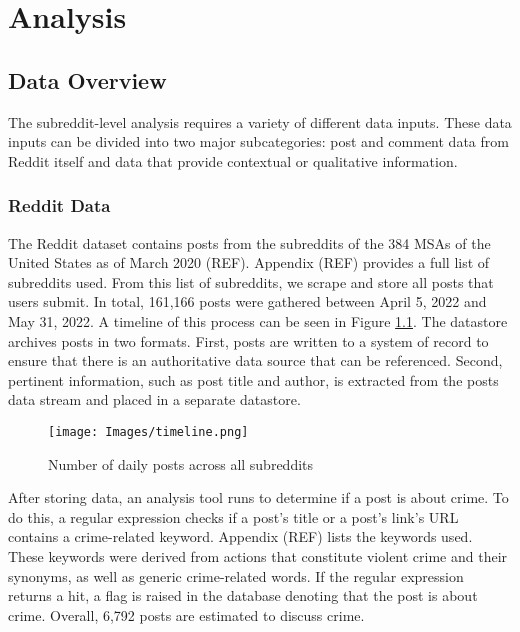 \documentclass[12pt,oneside, letterpaper]{book}
\begin{document}
\chapter{Analysis}

\section{Data Overview}
\par The subreddit-level analysis requires a variety of different data inputs. These data inputs can be divided into two major subcategories: post and comment data from Reddit itself and data that provide contextual or qualitative information.

\subsection{Reddit Data}
\par The Reddit dataset contains posts from the subreddits of the 384 MSAs of the United States as of March 2020 (REF). Appendix (REF) provides a full list of subreddits used. From this list of subreddits, we scrape and store all posts that users submit. In total, 161,166 posts were gathered between April 5, 2022 and May 31, 2022. A timeline of this process can be seen in Figure \ref{fig:line-1}. The datastore archives posts in two formats. First, posts are written to a system of record to ensure that there is an authoritative data source that can be referenced. Second, pertinent information, such as post title and author, is extracted from the posts data stream and placed in a separate datastore.

\begin{figure}[ht]
    \texttt{[image: Images/timeline.png]}
    \caption{Number of daily posts across all subreddits}
    \label{fig:line-1}
\end{figure}

\par After storing data, an analysis tool runs to determine if a post is about crime. To do this, a regular expression checks if a post's title or a post's link's URL contains a crime-related keyword. Appendix (REF) lists the keywords used. These keywords were derived from actions that constitute violent crime and their synonyms, as well as generic crime-related words. If the regular expression returns a hit, a flag is raised in the database denoting that the post is about crime. Overall, 6,792 posts are estimated to discuss crime.
\end{document}
